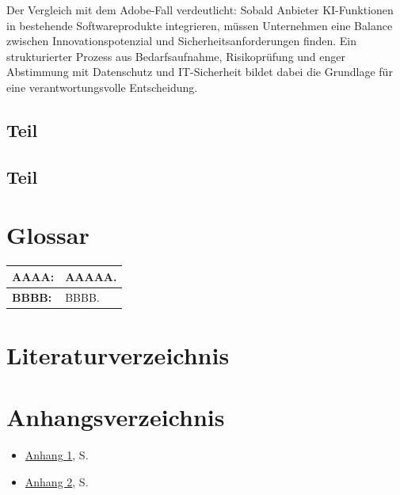 \documentclass[
    12pt, 
    a4paper,
    ]{scrartcl} %
\begin{document}
Der Vergleich mit dem Adobe-Fall verdeutlicht: Sobald Anbieter KI-Funktionen in bestehende Softwareprodukte integrieren, müssen Unternehmen eine Balance zwischen Innovationspotenzial und Sicherheitsanforderungen finden. Ein strukturierter Prozess aus Bedarfsaufnahme, Risikoprüfung und enger Abstimmung mit Datenschutz und IT-Sicherheit bildet dabei die Grundlage für eine verantwortungsvolle Entscheidung.



\subsection{Teil}

\subsection{Teil}
\section*{Glossar}  
\vspace{0.6cm}
\begin{tabular}{p{4cm} p{11.35cm}}   
    \hline
    \textbf{\normalsize AAAA:} & \normalsize AAAAA.\footnotemark[70]\\[0.5cm]
    \hline
    \textbf{\normalsize BBBB:} & \normalsize BBBB. \footnotemark[71]\\[0.5cm]
\end{tabular}


\newpage
\section*{Literaturverzeichnis} 

\renewcommand{\refname}{} %
\vspace{-\baselineskip} %

\newpage
\section*{Anhangsverzeichnis}
\vspace{0.6cm}
\begin{itemize}
    \item \hyperref[sec:Anhang1]{Anhang 1}, S. \pageref{sec:Anhang1}
    \item \hyperref[sec:Anhang2]{Anhang 2}, S. \pageref{sec:Anhang2}
\end{itemize}
\end{document}
